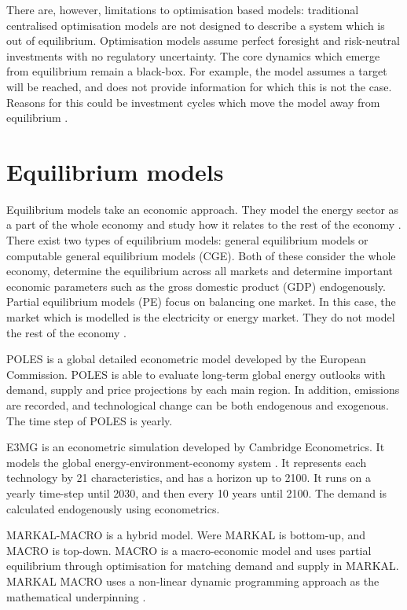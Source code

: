 There are, however, limitations to optimisation based models: traditional centralised optimisation models are not designed to describe a system which is out of equilibrium. Optimisation models assume perfect foresight and risk-neutral investments with no regulatory uncertainty. The core dynamics which emerge from equilibrium remain a black-box. For example, the model assumes a target will be reached, and does not provide information for which this is not the case. Reasons for this could be investment cycles which move the model away from equilibrium \cite{Chappin2017}.


\section{Equilibrium models}
\label{sec:litreview:equilibrium}

Equilibrium models take an economic approach. They model the energy sector as a part of the whole economy and study how it relates to the rest of the economy \cite{Ringkjob2018}. There exist two types of equilibrium models: general equilibrium models or computable general equilibrium models (CGE). Both of these consider the whole economy, determine the equilibrium across all markets and determine important economic parameters such as the gross domestic product (GDP) endogenously. Partial equilibrium models (PE) focus on balancing one market. In this case, the market which is modelled is the electricity or energy market. They do not model the rest of the economy \cite{Ringkjob2018, Hall2016a}. 

POLES is a global detailed econometric model developed by the European Commission. POLES is able to evaluate long-term global energy outlooks with demand, supply and price projections by each main region. In addition,  emissions are recorded, and technological change can be both endogenous and exogenous. The time step of POLES is yearly.

E3MG is an econometric simulation developed by Cambridge Econometrics. It models the global energy-environment-economy system \cite{Dagoumas2010}. It represents each technology by 21 characteristics, and has a horizon up to 2100. It runs on a yearly time-step until 2030, and then every 10 years until 2100. The demand is calculated endogenously using econometrics.

MARKAL-MACRO is a hybrid model. Were MARKAL is bottom-up, and MACRO is top-down. MACRO is a macro-economic model and uses partial equilibrium through optimisation for matching demand and supply in MARKAL. MARKAL MACRO uses a non-linear dynamic programming approach as the mathematical underpinning \cite{Hall2016a}.


